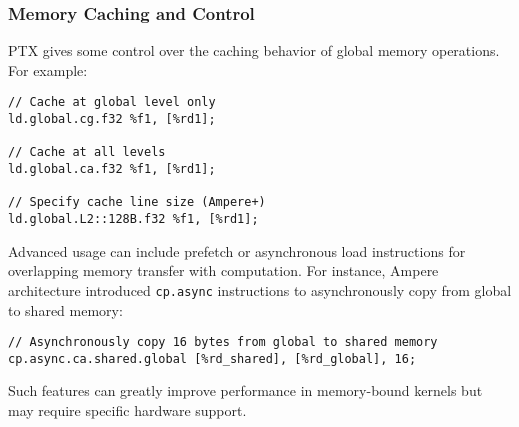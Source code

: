 \subsubsection{Memory Caching and Control}

PTX gives some control over the caching behavior of global memory operations. For example:

\begin{lstlisting}[style=ptx]
// Cache at global level only
ld.global.cg.f32 %f1, [%rd1];

// Cache at all levels
ld.global.ca.f32 %f1, [%rd1];

// Specify cache line size (Ampere+)
ld.global.L2::128B.f32 %f1, [%rd1];
\end{lstlisting}

Advanced usage can include prefetch or asynchronous load instructions for overlapping memory transfer with computation. For instance, Ampere architecture introduced \texttt{cp.async} instructions to asynchronously copy from global to shared memory:

\begin{lstlisting}[style=ptx]
// Asynchronously copy 16 bytes from global to shared memory
cp.async.ca.shared.global [%rd_shared], [%rd_global], 16;
\end{lstlisting}

Such features can greatly improve performance in memory-bound kernels but may require specific hardware support.

